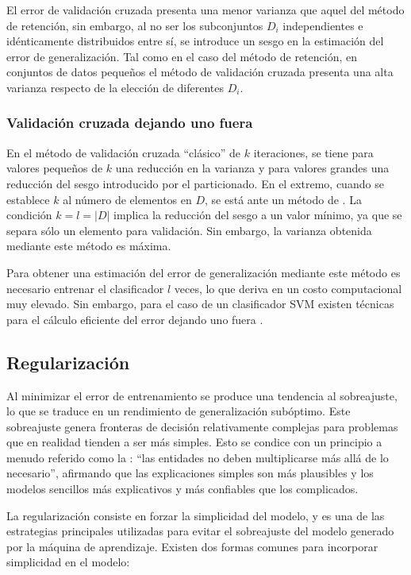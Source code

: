 El error de validación cruzada presenta una menor varianza que aquel
del método de retención, sin embargo, al no ser los subconjuntos $D_i$
independientes e idénticamente distribuidos entre sí, se introduce un
sesgo en la estimación del error de generalización.  Tal como en el
caso del método de retención, en conjuntos de datos pequeños el método
de validación cruzada presenta una alta varianza respecto de la
elección de diferentes $D_i$.

\subsubsection{Validación cruzada dejando uno fuera}
En el método de validación cruzada ``clásico'' de $k$ iteraciones, se
tiene para valores pequeños de $k$ una reducción en la varianza y para
valores grandes una reducción del sesgo introducido por el particionado.
En el extremo, cuando se
establece $k$ al número de elementos en $D$, se está ante un método de
. La condición $k=l=|D|$
implica la reducción del sesgo a un valor mínimo, ya que se separa
sólo un elemento para validación. Sin embargo, la varianza obtenida
mediante este método es máxima.

Para obtener una estimación del error de generalización mediante este
método es necesario entrenar el clasificador $l$ veces, lo que deriva
en un costo computacional muy elevado. Sin embargo, para el caso de un
clasificador SVM existen técnicas para el cálculo eficiente del error
dejando uno fuera \cite{chapelle, lee-keerthi}.

\subsection{Regularización}
Al minimizar el error de entrenamiento se produce una tendencia al
sobreajuste, lo que se traduce en un rendimiento de generalización
subóptimo. Este sobreajuste genera fronteras de decisión relativamente
complejas para problemas que en realidad tienden a ser más simples.
Esto se condice con un principio a menudo referido como la :
``las entidades no deben multiplicarse más allá de lo necesario'',
afirmando que las explicaciones simples son más plausibles y los
modelos sencillos más explicativos y más confiables que los
complicados.

La regularización consiste en forzar la simplicidad del modelo, y es
una de las estrategias principales utilizadas para evitar el
sobreajuste del modelo generado por la máquina de aprendizaje. Existen
dos formas comunes para incorporar simplicidad en el modelo:

